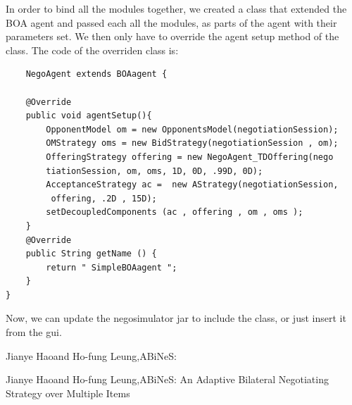 \documentclass[html]{report}    %
\begin{document}
In order to bind all the modules together, we created a class that extended the BOA agent and passed each all the modules, as parts of the agent with their parameters set. We then only have to override the agent setup method of the class.  The code of the overriden class is:


\begin{verbatim}
	NegoAgent extends BOAagent {
    
    @Override
    public void agentSetup(){
        OpponentModel om = new OpponentsModel(negotiationSession);
        OMStrategy oms = new BidStrategy(negotiationSession , om);
        OfferingStrategy offering = new NegoAgent_TDOffering(nego
        tiationSession, om, oms, 1D, 0D, .99D, 0D);
        AcceptanceStrategy ac =  new AStrategy(negotiationSession,
         offering, .2D , 15D);
        setDecoupledComponents (ac , offering , om , oms );
    }
    @Override
    public String getName () {
        return " SimpleBOAagent ";
    }
}
\end{verbatim}
Now, we can update the negosimulator jar to include the class, or just insert it from the gui.







\begin{thebibliography}{5}

 Jianye Haoand Ho-fung Leung,ABiNeS:

 Jianye Haoand Ho-fung Leung,ABiNeS: An Adaptive Bilateral Negotiating Strategy over Multiple Items
\end{thebibliography}
\end{document}
